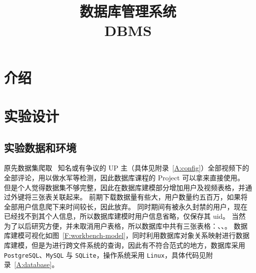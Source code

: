 %
%
%
\title{数据库管理系统 \\ DBMS}

\maketitle\tableofcontents\clearpage

\section{介绍}
\lipsum[1]



\section{实验设计}
\subsection{实验数据和环境}
原先数据集爬取 \bilibili\ 知名或有争议的 UP 主（具体见附录~\ref{A:config}）全部视频下的全部评论，用以做水军等检测，因此数据库课程的 Project 可以拿来直接使用。
但是个人觉得数据集不够完整，因此在数据库建模部分增加用户及视频表格，并通过外键将三张表关联起来。
前期下载数据量有些大，用户数量约五百万，如果将全部用户信息爬下来时间较长，因此放弃。
同时期间有被永久封禁的用户，现在已经找不到其个人信息，所以数据库建模时用户信息省略，仅保存其 uid。
当然为了以后研究方便，并未取消用户表格，所以数据库中共有三张表格：、、。
数据库建模可视化如图~\ref{F:workbench-model}，同时利用数据库对象关系映射\cite{sqlalchemy2020sqlalchemy}进行数据库建模，但是为进行跨文件系统的查询，因此有不符合范式的地方，数据库采用 \texttt{PostgreSQL}、\texttt{MySQL} 与 \texttt{SQLite}，操作系统采用 \texttt{Linux}，具体代码见附录~\ref{A:database}。

